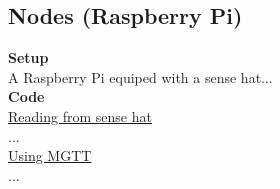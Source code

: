 \subsection{Nodes (Raspberry Pi)}
\textbf{Setup}\\
A Raspberry Pi equiped with a sense hat...\\

\noindent\textbf{Code}\\
\underline{Reading from sense hat}\\
...\\
\underline{Using MGTT}\\
...
